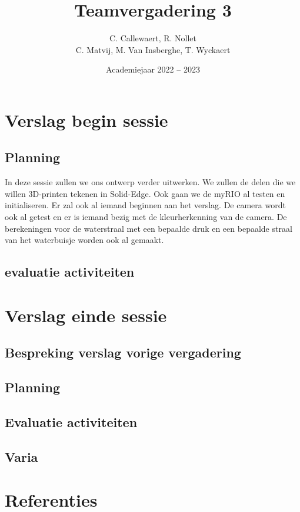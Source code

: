 \documentclass{kulakarticle}
\title{Teamvergadering 3}
\author{C. Callewaert, R. Nollet \\
	C. Matvij, M. Van Insberghe, T. Wyckaert }
\date{Academiejaar 2022 -- 2023}
\begin{document}
	\maketitle
	\section{Verslag begin sessie}
	

	
	\subsection{Planning}
	In deze sessie zullen we ons ontwerp verder uitwerken. We zullen de delen die we willen 3D-printen tekenen in Solid-Edge. Ook gaan we de myRIO al testen en initialiseren.  Er zal ook al iemand beginnen aan het verslag. De camera wordt ook al getest en er is iemand bezig met de kleurherkenning van de camera. De berekeningen voor de waterstraal met een bepaalde druk en een bepaalde straal van het waterbuisje worden ook al gemaakt. 
	\subsection{evaluatie activiteiten}


	
	\section{Verslag einde sessie}
	
	\subsection{Bespreking verslag vorige vergadering}
	\subsection{Planning}
	\subsection{Evaluatie activiteiten}
	\subsection{Varia}
	
	\section*{Referenties}
	
\end{document}
